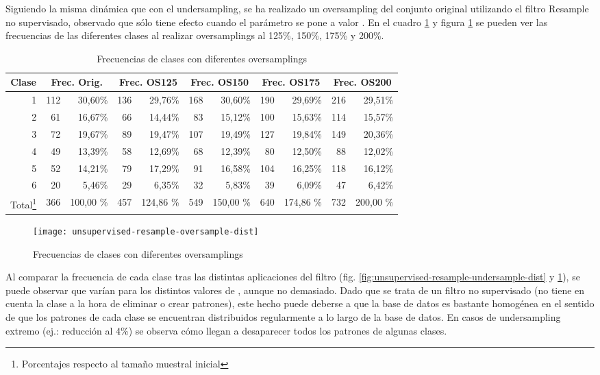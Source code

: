 Siguiendo la misma dinámica que con el undersampling, se ha realizado un oversampling del conjunto original utilizando el filtro Resample no supervisado, observado que sólo tiene efecto cuando el parámetro  se pone a valor . En el cuadro \ref{tab:unsupervised-resample-oversample-dist} y figura \ref{fig:unsupervised-resample-oversample-dist} se pueden ver las frecuencias de las diferentes clases al realizar oversamplings al 125\%, 150\%, 175\% y 200\%.

\begin{table}[ht]
    \centering
    \begin{tabular}{|r|rr|rr|rr|rr|rr|}
        \hline
        \multicolumn{1}{|c|}{Clase} & \multicolumn{2}{c|}{Frec. Orig.} & \multicolumn{2}{c|}{Frec. OS125} & \multicolumn{2}{c|}{Frec. OS150} & \multicolumn{2}{c|}{Frec. OS175} & \multicolumn{2}{c|}{Frec. OS200} \\ 
        \hline
        1 & 112 & 30,60\% & 136 & 29,76\% & 168 & 30,60\% & 190 & 29,69\% & 216 & 29,51\% \\
        2 & 61  & 16,67\% & 66  & 14,44\% & 83  & 15,12\% & 100 & 15,63\% & 114 & 15,57\% \\
        3 & 72  & 19,67\% & 89  & 19,47\% & 107 & 19,49\% & 127 & 19,84\% & 149 & 20,36\% \\
        4 & 49  & 13,39\% & 58  & 12,69\% & 68  & 12,39\% & 80  & 12,50\% & 88  & 12,02\% \\
        5 & 52  & 14,21\% & 79  & 17,29\% & 91  & 16,58\% & 104 & 16,25\% & 118 & 16,12\% \\
        6 & 20  & 5,46\%  & 29  & 6,35\%  & 32  & 5,83\%  & 39  & 6,09\%  & 47  & 6,42\%  \\
        \hline
        Total\footnote{Porcentajes respecto al tamaño muestral inicial} & 366 & 100,00 \% & 457 & 124,86 \% & 549          & 150,00 \% & 640 & 174,86 \% & 732 & 200,00 \% \\
        \hline
    \end{tabular}
    \caption{Frecuencias de clases con diferentes oversamplings}
    \label{tab:unsupervised-resample-oversample-dist}
\end{table}
\begin{figure}[ht]
    \centering
    \texttt{[image: unsupervised-resample-oversample-dist]}
    \caption{Frecuencias de clases con diferentes oversamplings}
    \label{fig:unsupervised-resample-oversample-dist}
\end{figure}

Al comparar la frecuencia de cada clase tras las distintas aplicaciones del filtro (fig. \ref{fig:unsupervised-resample-undersample-dist} y \ref{fig:unsupervised-resample-oversample-dist}), se puede observar que varían para los distintos valores de , aunque no demasiado. Dado que se trata de un filtro no supervisado (no tiene en cuenta la clase a la hora de eliminar o crear patrones), este hecho puede deberse a que la base de datos es bastante homogénea en el sentido de que los patrones de cada clase se encuentran distribuidos regularmente a lo largo de la base de datos. En casos de undersampling extremo (ej.: reducción al 4\%) se observa cómo llegan a desaparecer todos los patrones de algunas clases.

